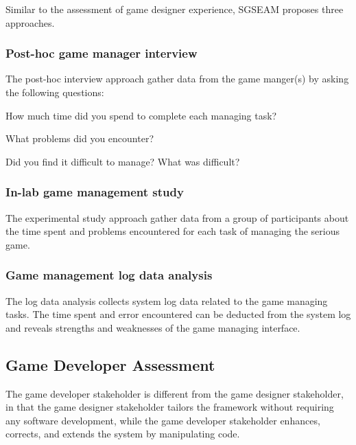 \documentclass[11pt]{article}
\begin{document}
Similar to the assessment of game designer experience, SGSEAM proposes three approaches. 

\subsubsection{Post-hoc game manager interview}
\label{Post-hoc game manager interview}

The post-hoc interview approach gather data from the game manger(s) by asking the following questions:\\
 
\begin{compactitem}
\item How much time did you spend to complete each managing task?
\item What problems did you encounter?
\item Did you find it difficult to manage? What was difficult?\\
\end{compactitem}

\subsubsection{In-lab game management study}
\label{In-lab game management study}

The experimental study approach gather data from a group of participants about the time spent and
problems encountered for each task of managing the serious game. 

\subsubsection{Game management log data analysis}
\label{Game management log data analysis}

The log data analysis collects system log data related to the game managing tasks. The time spent and error encountered can be deducted from the system log and reveals strengths and weaknesses of the game managing interface.

\subsection{Game Developer Assessment}

The game developer stakeholder is different from the game designer stakeholder, in that the
game designer stakeholder tailors the framework without requiring any software
development, while the game developer stakeholder enhances, corrects, and extends the system by
manipulating code. 
\end{document}
